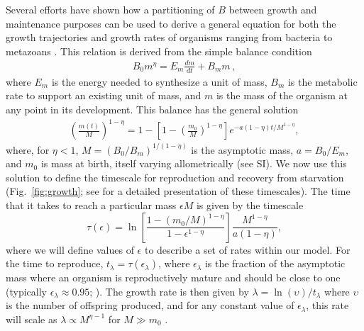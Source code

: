 \documentclass[twocolumn,preprintnumbers,amsmath,amssymb,superscriptaddress]{revtex4}
\begin{document}
\begin{bibunit}[unsrt]
Several efforts have shown how a partitioning of $B$ between growth and
maintenance purposes can be used to derive a general equation for both the
growth trajectories and growth rates of organisms ranging from bacteria to
metazoans
\cite{West:2001bv,moses2008rmo,gillooly2002esa,hou,Kempes:2012hy}. This relation is derived from the simple balance condition \cite{West:2001bv,moses2008rmo,gillooly2002esa,hou,Kempes:2012hy}
\begin{eqnarray}
\label{balance}
B_{0}m^{\eta}=E_{m}\frac{dm}{dt}+B_{m}m\,,
\end{eqnarray}
where $E_{m}$ is the energy needed to synthesize a unit of mass, $B_{m}$ is
the metabolic rate to support an existing unit of mass, and $m$ is the mass
of the organism at any point in its development.  This balance has the
general solution \cite{bettencourt,Kempes:2012hy}
\begin{eqnarray}
\label{m1}
\left(\frac{m\left(t\right)}{M}\right)^{1-\eta}\!=1\!-\!\left[1\!-\!\left(\frac{m_{0}}{M}\right)^{1\!-\!\eta}\right]e^{-a\left(1\!-\!\eta\right)t/M^{1-\eta}},
\end{eqnarray}
where, for $\eta<1$, $M=(B_{0}/B_{m})^{1/(1-\eta)}$ is the asymptotic mass, $a=B_{0}/E_{m}$, and $m_0$ is mass at birth, itself varying allometrically (see SI).  We now use this solution to define the timescale for reproduction and recovery from starvation (Fig.~\ref{fig:growth}; see \cite{moses2008rmo} for a detailed presentation of these timescales). The time that it takes to reach a particular mass $\epsilon M$ is given by the timescale
\begin{equation}
\label{t1}
\tau\left(\epsilon\right) = \ln\left[\frac{1-\left(m_{0}/M\right)^{1-\eta}}{1-\epsilon^{1-\eta}}\right]\frac{M^{1-\eta}}{a\left(1-\eta\right)},
\end{equation}
where we will define values of $\epsilon$ to describe a set of rates within our model. For the time to reproduce, $t_{\lambda}=\tau\left(\epsilon_{\lambda}\right)$, where $\epsilon_{\lambda}$ is the fraction of the asymptotic mass where an organism is reproductively mature and should be close to one (typically $\epsilon_{\lambda}\approx0.95$; \cite{West:2001bv}). The growth rate is then given by $\lambda=\ln\left(\upsilon\right)/t_{\lambda}$ where $\upsilon$ is the number of offspring produced, and for any constant value of $\epsilon_{\lambda}$, this rate will scale as $\lambda\propto M^{\eta-1}$ for $M\gg m_{0}$ \cite{West:2001bv,moses2008rmo,gillooly2002esa,hou,Kempes:2012hy}.


\end{bibunit}
\end{document}
